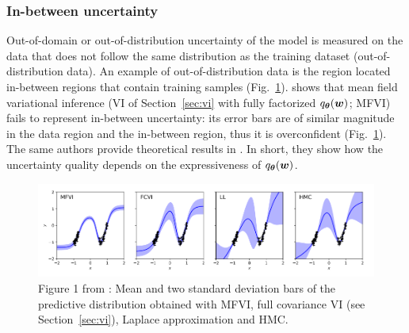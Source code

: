 \subsubsection{In-between uncertainty}
Out-of-domain or out-of-distribution uncertainty of the model is measured on the data that does not follow the same distribution as the training dataset (out-of-distribution data).
An example of out-of-distribution data is the region located in-between regions that contain training samples (Fig.~\ref{fig:inbetween}).
\textcite{foong2019inbetween} shows that mean field variational inference (VI of Section~\ref{sec:vi} with fully factorized $q_{\boldsymbol{\theta}}(\boldsymbol{w})$; MFVI) fails to represent in-between uncertainty: its error bars are of similar magnitude in the data region and the in-between region, thus it is overconfident (Fig.~\ref{fig:inbetween}). 
The same authors provide theoretical results in \textcite{foong2019expressiveness}. 
In short, they show how the uncertainty quality depends on the expressiveness of $q_{\boldsymbol{\theta}}(\boldsymbol{w})$.
\begin{figure}
	\centering
	\includegraphics[width=1\linewidth]{./Figures/inbetween.png}
	\caption{Figure 1 from \textcite{foong2019inbetween}: Mean and two standard deviation bars of the predictive distribution obtained with MFVI, full covariance VI (see Section~\ref{sec:vi}), Laplace approximation and HMC.}
	\label{fig:inbetween}
\end{figure} 

